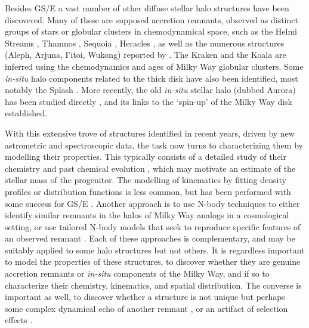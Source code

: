 Besides GS/E a vast number of other diffuse stellar halo structures have been discovered. Many of these are supposed accretion remnants, observed as distinct groups of stars or globular clusters in chemodynamical space, such as the Helmi Streams \parencite{helmi99,koppelman19a}, Thamnos \parencite{koppelman19b}, Sequoia \parencite{myeong19}, Heracles \parencite{horta21a}, as well as the numerous structures (Aleph, Arjuna, I'itoi, Wukong) reported by \textcite{naidu20}. The Kraken \parencite{kruijssen20} and the Koala \parencite{forbes20} are inferred using the chemodynamics and ages of Milky Way globular clusters. Some \textit{in-situ} halo components related to the thick disk have also been identified, most notably the Splash \parencite{belokurov20}. More recently, the old \textit{in-situ} stellar halo (dubbed Aurora) has been studied directly \parencite{belokurov22,conroy22,rix22}, and its links to the `spin-up' of the Milky Way disk established.

With this extensive trove of structures identified in recent years, driven by new astrometric and spectroscopic data, the task now turns to characterizing them by modelling their properties. This typically consists of a detailed study of their chemistry and past chemical evolution \parencite[e.g., for GS/E see][]{vincenzo19,monty20,hasselquist21}, which may motivate an estimate of the stellar mass of the progenitor. The modelling of kinematics by fitting density profiles or distribution functions is less common, but has been performed with some success for GS/E \parencite{lancaster19,mackereth20,iorio21,han22,lane23}. Another approach is to use N-body techniques to either identify similar remnants in the halos of Milky Way analogs in a cosmological setting, or use tailored N-body models that seek to reproduce specific features of an observed remnant \parencite[e.g.,][again for GS/E]{fattahi19,mackereth19a,naidu21,amarante22}. Each of these approaches is complementary, and may be suitably applied to some halo structures but not others. It is regardless important to model the properties of these structures, to discover whether they are genuine accretion remnants or \textit{in-situ} components of the Milky Way, and if so to characterize their chemistry, kinematics, and spatial distribution. The converse is important as well, to discover whether a structure is not unique but perhaps some complex dynamical echo of another remnant \parencite[see][]{jean-baptiste17}, or an artifact of selection effects \parencite[see][]{lane22}.

